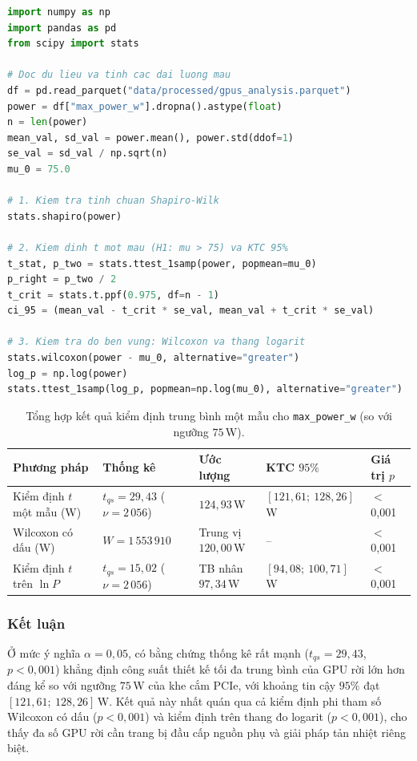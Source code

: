 \documentclass[12pt,a4paper]{article}
\begin{document}
\begin{lstlisting}[language=Python]
import numpy as np
import pandas as pd
from scipy import stats

# Doc du lieu va tinh cac dai luong mau
df = pd.read_parquet("data/processed/gpus_analysis.parquet")
power = df["max_power_w"].dropna().astype(float)
n = len(power)
mean_val, sd_val = power.mean(), power.std(ddof=1)
se_val = sd_val / np.sqrt(n)
mu_0 = 75.0

# 1. Kiem tra tinh chuan Shapiro-Wilk
stats.shapiro(power)

# 2. Kiem dinh t mot mau (H1: mu > 75) va KTC 95%
t_stat, p_two = stats.ttest_1samp(power, popmean=mu_0)
p_right = p_two / 2
t_crit = stats.t.ppf(0.975, df=n - 1)
ci_95 = (mean_val - t_crit * se_val, mean_val + t_crit * se_val)

# 3. Kiem tra do ben vung: Wilcoxon va thang logarit
stats.wilcoxon(power - mu_0, alternative="greater")
log_p = np.log(power)
stats.ttest_1samp(log_p, popmean=np.log(mu_0), alternative="greater")
\end{lstlisting}

\begin{table}[H]
  \centering
  \small
  \caption{Tổng hợp kết quả kiểm định trung bình một mẫu cho \texttt{max\_power\_w} (so với ngưỡng $75$\,W).}
  \label{tab:one_sample_summary}
  \renewcommand{\arraystretch}{1.25}
  \begin{tabular}{|l|l|l|l|l|}
    \hline
    \rowcolor{TableHead}
    \textbf{Phương pháp} & \textbf{Thống kê} & \textbf{Ước lượng} & \textbf{KTC $95\%$} & \textbf{Giá trị $p$} \\ \hline
    Kiểm định $t$ một mẫu (W) & $t_{qs} = 29{,}43$ ($\nu = 2\,056$) & $124{,}93$\,W & $[121{,}61;\ 128{,}26]$\,W & $<$ 0,001 \\ \hline
    Wilcoxon có dấu (W) & $W = 1\,553\,910$ & Trung vị $120{,}00$\,W & -- & $<$ 0,001 \\ \hline
    Kiểm định $t$ trên $\ln P$ & $t_{qs} = 15{,}02$ ($\nu = 2\,056$) & TB nhân $97{,}34$\,W & $[94{,}08;\ 100{,}71]$\,W & $<$ 0,001 \\ \hline
  \end{tabular}
\end{table}

\subsubsection{Kết luận}

Ở mức ý nghĩa $\alpha = 0{,}05$, có bằng chứng thống kê rất mạnh ($t_{qs} = 29{,}43$, $p < 0{,}001$) khẳng định công suất thiết kế tối đa trung bình của GPU rời lớn hơn đáng kể so với ngưỡng $75$\,W của khe cắm PCIe, với khoảng tin cậy $95\%$ đạt $[121{,}61;\ 128{,}26]$\,W. Kết quả này nhất quán qua cả kiểm định phi tham số Wilcoxon có dấu ($p < 0{,}001$) và kiểm định trên thang đo logarit ($p < 0{,}001$), cho thấy đa số GPU rời cần trang bị đầu cấp nguồn phụ và giải pháp tản nhiệt riêng biệt.
\end{document}
